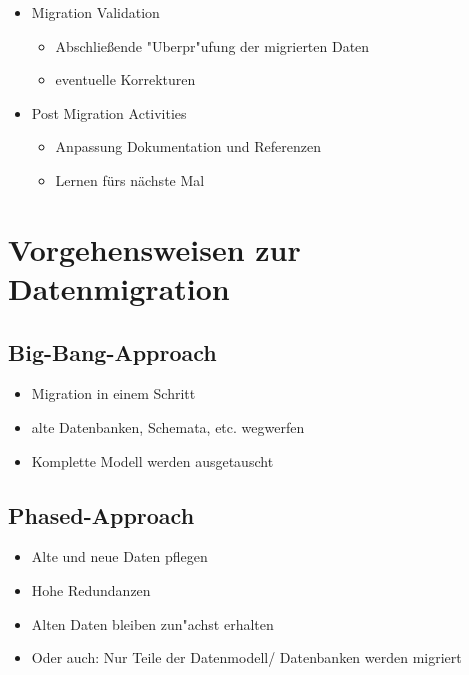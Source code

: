 \documentclass[11pt]{scrartcl}
\begin{document}
\begin{itemize}
\begin{itemize}
		\item Migration Validation
		\begin{itemize}
			\item Abschließende "Uberpr"ufung der migrierten Daten
			\item eventuelle Korrekturen
		\end{itemize}
		
		\item Post Migration Activities
		\begin{itemize}
			\item Anpassung Dokumentation und Referenzen
			\item Lernen fürs nächste Mal
		\end{itemize}
		
	\end{itemize}
\end{itemize}

\section{Vorgehensweisen zur Datenmigration}

\subsection{Big-Bang-Approach}

\begin{itemize}
	\item Migration in einem Schritt
	\item alte Datenbanken, Schemata, etc. wegwerfen
	\item Komplette Modell werden ausgetauscht
\end{itemize}

\subsection{Phased-Approach}

\begin{itemize}
	\item Alte und neue Daten pflegen
	\item Hohe Redundanzen
	\item Alten Daten bleiben zun"achst erhalten
	\item Oder auch: Nur Teile der Datenmodell/ Datenbanken werden migriert
\end{itemize}
\end{document}
